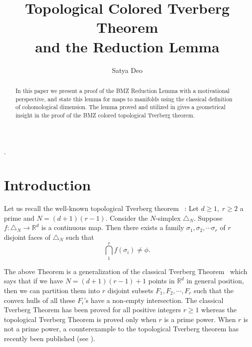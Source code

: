 \documentclass[11pt]{amsart}
\def\R{\mathbb R}
\def\t{\triangle}
\def\bn{\bigskip\noindent}
\begin{document}
\title{\sc Topological Colored Tverberg Theorem\\ and the Reduction Lemma}
\author{Satya Deo}
\address{Harish-chandra Research Institute (HRI)  Allahabad}
\date{}

\maketitle

\let\thefootnote\relax{} .\\


\begin{abstract} In this paper we present a proof of the BMZ Reduction Lemma with a motivational perspective, and state this lemma for maps to manifolds using the classical definition of cohomological dimension. The lemma proved  and utilized in \cite{bmz} gives a geometrical insight in the proof of the BMZ colored topological Tverberg theorem.
\end{abstract}


\section{Introduction}
Let us recall the well-known topological Tverberg theorem  ~\cite{bar-shl-sz}:
{\Thm  Let $d\geq 1, \;r\geq 2$ a prime and  $N=(d+1)(r-1)$. Consider the $N$-simplex $\triangle_N$. Suppose $f: \t_N \to \R^d$ is a continuous map. Then there exists a family $\sigma_1,\sigma_2,\cdots\sigma_r$ of $r$ disjoint faces of $\t_N$ such that} $$\bigcap^{r}_{1}f(\sigma_i)\neq\phi.$$

\bn The above Theorem is a generalization of the classical Tverberg Theorem~\cite{tve} which says that if we have $N=(d+1)(r-1)+1$ points in $\R^d$ in general position, then we can partition them into $r$ disjoint subsets $F_1, F_2,\cdots , F_r$ such that the convex hulls of all these $F_i$'s have a non-empty intersection. The classical Tverberg Theorem has been proved for all positive integers $r\geq 1$ whereas the topological Tverberg Theorem is proved only when $r$ is a prime power. When $r$ is not a prime power, a counterexample to the topological Tverberg theorem has recently been published (see \cite {fri}).
\end{document}
